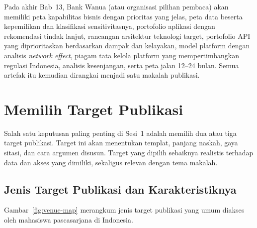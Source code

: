 Pada akhir Bab~13, Bank Wanua (atau organisasi pilihan pembaca) akan memiliki
peta kapabilitas bisnis dengan prioritas yang jelas, peta data beserta
kepemilikan dan klasifikasi sensitivitasnya, portofolio aplikasi dengan
rekomendasi tindak lanjut, rancangan arsitektur teknologi target, portofolio
API yang diprioritaskan berdasarkan dampak dan kelayakan, model platform
dengan analisis \emph{network effect}, piagam tata kelola platform yang
mempertimbangkan regulasi Indonesia, analisis kesenjangan, serta peta jalan
12--24 bulan. Semua artefak itu kemudian dirangkai menjadi satu makalah
publikasi.

\section{Memilih Target Publikasi}

Salah satu keputusan paling penting di Sesi~1 adalah memilih dua atau tiga
target publikasi. Target ini akan menentukan templat, panjang naskah, gaya
sitasi, dan cara argumen disusun. Target yang dipilih sebaiknya realistis
terhadap data dan akses yang dimiliki, sekaligus relevan dengan tema makalah.

\subsection{Jenis Target Publikasi dan Karakteristiknya}

Gambar~\ref{fig:venue-map} merangkum jenis target publikasi yang umum diakses oleh
mahasiswa pascasarjana di Indonesia.

